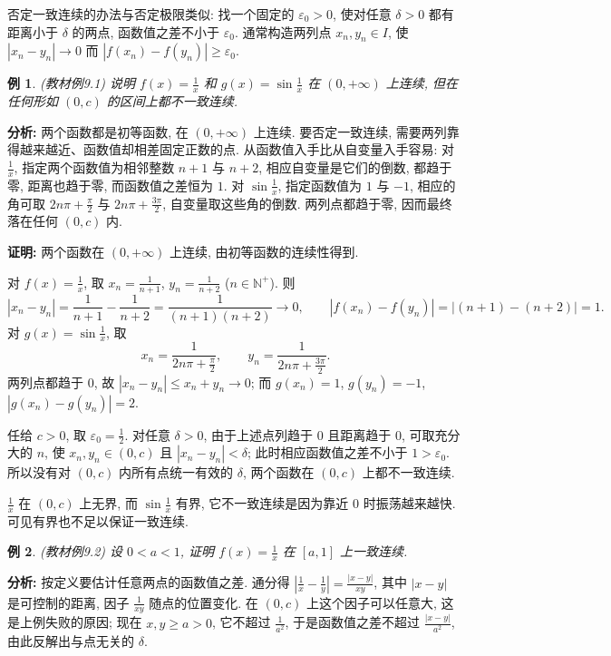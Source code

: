 \documentclass[UTF8,openany]{ctexbook}
\theoremstyle{chinesetextbook}
\newtheorem{example}{例}[section]
\newenvironment{cnproof}{\par\indent\textbf{证明:} \ignorespaces}{\par}
\begin{document}
否定一致连续的办法与否定极限类似: 找一个固定的 $\varepsilon_0>0$, 使对任意 $\delta>0$ 都有距离小于 $\delta$ 的两点, 函数值之差不小于 $\varepsilon_0$. 通常构造两列点 $x_n,y_n\in I$, 使 $|x_n-y_n|\to0$ 而 $|f(x_n)-f(y_n)|\ge\varepsilon_0$.
\begin{example}
\textnormal{(教材例9.1)} 说明 $\displaystyle f(x)=\frac1x$ 和 $\displaystyle g(x)=\sin\frac1x$ 在 $(0,+\infty)$ 上连续, 但在任何形如 $(0,c)$ 的区间上都不一致连续.
\end{example}
\par\indent\textbf{分析:} 两个函数都是初等函数, 在 $(0,+\infty)$ 上连续. 要否定一致连续, 需要两列靠得越来越近、函数值却相差固定正数的点. 从函数值入手比从自变量入手容易: 对 $\displaystyle\frac1x$, 指定两个函数值为相邻整数 $n+1$ 与 $n+2$, 相应自变量是它们的倒数, 都趋于零, 距离也趋于零, 而函数值之差恒为 $1$. 对 $\displaystyle\sin\frac1x$, 指定函数值为 $1$ 与 $-1$, 相应的角可取 $\displaystyle2n\pi+\frac\pi2$ 与 $\displaystyle2n\pi+\frac{3\pi}2$, 自变量取这些角的倒数. 两列点都趋于零, 因而最终落在任何 $(0,c)$ 内.
\begin{cnproof}
两个函数在 $(0,+\infty)$ 上连续, 由初等函数的连续性得到.

对 $\displaystyle f(x)=\frac1x$, 取 $\displaystyle x_n=\frac1{n+1}$, $\displaystyle y_n=\frac1{n+2}$ ($n\in\mathbb N^+$). 则
\[
|x_n-y_n|=\frac1{n+1}-\frac1{n+2}=\frac1{(n+1)(n+2)}\to0,\qquad
|f(x_n)-f(y_n)|=|(n+1)-(n+2)|=1.
\]
对 $\displaystyle g(x)=\sin\frac1x$, 取
\[
x_n=\frac1{2n\pi+\frac\pi2},\qquad
y_n=\frac1{2n\pi+\frac{3\pi}2}.
\]
两列点都趋于 $0$, 故 $|x_n-y_n|\le x_n+y_n\to0$; 而 $g(x_n)=1$, $g(y_n)=-1$, $|g(x_n)-g(y_n)|=2$.

任给 $c>0$, 取 $\displaystyle\varepsilon_0=\frac12$. 对任意 $\delta>0$, 由于上述点列趋于 $0$ 且距离趋于 $0$, 可取充分大的 $n$, 使 $x_n,y_n\in(0,c)$ 且 $|x_n-y_n|<\delta$; 此时相应函数值之差不小于 $1>\varepsilon_0$. 所以没有对 $(0,c)$ 内所有点统一有效的 $\delta$, 两个函数在 $(0,c)$ 上都不一致连续.
\end{cnproof}
$\displaystyle\frac1x$ 在 $(0,c)$ 上无界, 而 $\displaystyle\sin\frac1x$ 有界, 它不一致连续是因为靠近 $0$ 时振荡越来越快. 可见有界也不足以保证一致连续.
\begin{example}
\textnormal{(教材例9.2)} 设 $0<a<1$, 证明 $\displaystyle f(x)=\frac1x$ 在 $[a,1]$ 上一致连续.
\end{example}
\par\indent\textbf{分析:} 按定义要估计任意两点的函数值之差. 通分得 $\displaystyle\left|\frac1x-\frac1y\right|=\frac{|x-y|}{xy}$, 其中 $|x-y|$ 是可控制的距离, 因子 $\displaystyle\frac1{xy}$ 随点的位置变化. 在 $(0,c)$ 上这个因子可以任意大, 这是上例失败的原因; 现在 $x,y\ge a>0$, 它不超过 $\displaystyle\frac1{a^2}$, 于是函数值之差不超过 $\displaystyle\frac{|x-y|}{a^2}$, 由此反解出与点无关的 $\delta$.
\end{document}
